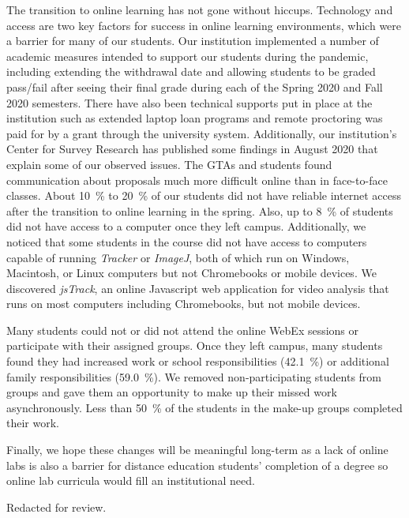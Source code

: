 \documentclass[aip, numerical, preprint]{revtex4-2}
\begin{document}
The transition to online learning has not gone without hiccups.  Technology and access are two
key factors for success in online learning environments, which were a barrier for many of our
students.  Our institution implemented a number of academic measures intended to support our
students during the pandemic, including extending the withdrawal date and allowing students to
be graded pass/fail after seeing their final grade during each of the Spring 2020 and Fall 2020
semesters. There have also been technical supports put in place at the institution such as
extended laptop loan programs and remote proctoring was paid for by a grant through the
university system. Additionally, our institution's Center for Survey Research has published
some findings in August 2020 that explain some of our observed
issues.\citep{ECUcovidSurveyRedacted} The GTAs and students found communication about proposals
much more difficult online than in face-to-face classes.  About \SI{10}{\percent} to
\SI{20}{\percent} of our students did not have reliable internet access after the transition to
online learning in the spring.\citep{ECUcovidSurveyRedacted} Also, up to \SI{8}{\percent} of
students did not have access to a computer once they left campus.\citep{ECUcovidSurveyRedacted}
Additionally, we noticed that some students in the course did not have access to computers
capable of running \emph{Tracker} or \emph{ImageJ}, both of which run on Windows, Macintosh, or
Linux computers but not Chromebooks or mobile devices. We discovered
\emph{jsTrack}\citep{jstrack}, an online Javascript web application for video analysis that
runs on most computers including Chromebooks, but not mobile devices.

Many students could not or did not attend the online WebEx sessions or participate with their
assigned groups.  Once they left campus, many students found they had increased work or school
responsibilities (\SI{42.1}{\percent}) or additional family responsibilities
(\SI{59.0}{\percent}).\citep{ECUcovidSurveyRedacted} We removed non-participating students from
groups and gave them an opportunity to make up their missed work asynchronously. Less than
\SI{50}{\percent} of the students in the make-up groups completed their work.

Finally, we hope these changes will be meaningful long-term as a lack of online labs is also a
barrier for distance education students' completion of a degree so online lab curricula would
fill an institutional need.


\begin{acknowledgments}
  Redacted for review.%
\end{acknowledgments}


\end{document}
